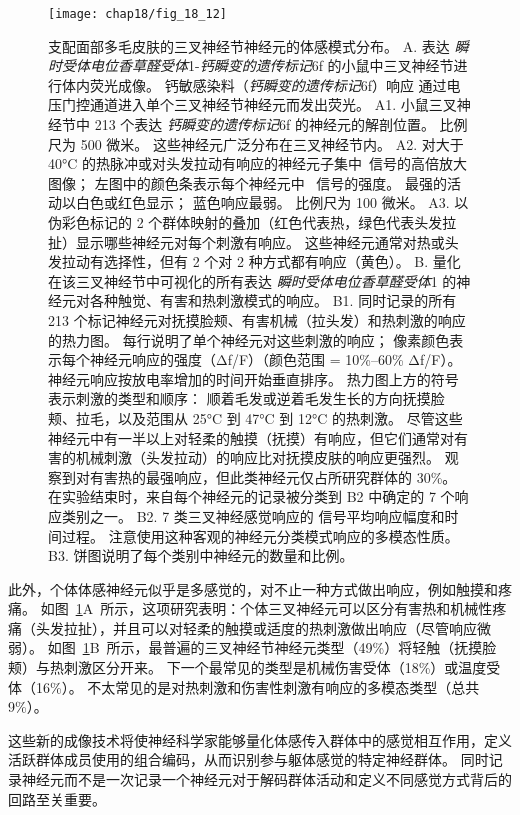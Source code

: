 \begin{figure}[htbp]
	\centering
	\texttt{[image: chap18/fig\_18\_12]}
	\caption{支配面部多毛皮肤的三叉神经节神经元的体感模式分布\cite{ghitani2017specialized}。
		A. 表达 \textit{瞬时受体电位香草醛受体}1-\textit{钙瞬变的遗传标记}6f 的小鼠中三叉神经节进行体内荧光成像。
		钙敏感染料（\textit{钙瞬变的遗传标记}6f）响应  通过电压门控通道进入单个三叉神经节神经元而发出荧光。
		A1. 小鼠三叉神经节中 213 个表达 \textit{钙瞬变的遗传标记}6f 的神经元的解剖位置。
		比例尺为 500 微米。
		这些神经元广泛分布在三叉神经节内。 
		A2. 对大于 40°C 的热脉冲或对头发拉动有响应的神经元子集中~信号的高倍放大图像；
		左图中的颜色条表示每个神经元中~ 信号的强度。
		最强的活动以白色或红色显示；
		蓝色响应最弱。
		比例尺为 100 微米。
		A3. 以伪彩色标记的 2 个群体映射的叠加（红色代表热，绿色代表头发拉扯）显示哪些神经元对每个刺激有响应。
		这些神经元通常对热或头发拉动有选择性，但有 2 个对 2 种方式都有响应（黄色）。
		B. 量化在该三叉神经节中可视化的所有表达 \textit{瞬时受体电位香草醛受体}1 的神经元对各种触觉、有害和热刺激模式的响应。
		B1. 同时记录的所有 213 个标记神经元对抚摸脸颊、有害机械（拉头发）和热刺激的响应的热力图。
		每行说明了单个神经元对这些刺激的响应；
		像素颜色表示每个神经元响应的强度（Δf/F）（颜色范围 = 10\%–60\% Δf/F）。
		神经元响应按放电率增加的时间开始垂直排序。
		热力图上方的符号表示刺激的类型和顺序：
		顺着毛发或逆着毛发生长的方向抚摸脸颊、拉毛，以及范围从 25°C 到 47°C 到 12°C 的热刺激。
		尽管这些神经元中有一半以上对轻柔的触摸（抚摸）有响应，但它们通常对有害的机械刺激（头发拉动）的响应比对抚摸皮肤的响应更强烈。
		观察到对有害热的最强响应，但此类神经元仅占所研究群体的 30\%。
		在实验结束时，来自每个神经元的记录被分类到 B2 中确定的 7 个响应类别之一。
		B2. 7 类三叉神经感觉响应的  信号平均响应幅度和时间过程。
		注意使用这种客观的神经元分类模式响应的多模态性质。
		B3. 饼图说明了每个类别中神经元的数量和比例。}
	\label{fig:18_12}
\end{figure}


此外，个体体感神经元似乎是多感觉的，对不止一种方式做出响应，例如触摸和疼痛。
如图~\ref{fig:18_12}A~所示，这项研究表明：个体三叉神经元可以区分有害热和机械性疼痛（头发拉扯），并且可以对轻柔的触摸或适度的热刺激做出响应（尽管响应微弱）。
如图~\ref{fig:18_12}B~所示，最普遍的三叉神经节神经元类型（49\%）将轻触（抚摸脸颊）与热刺激区分开来。 
下一个最常见的类型是机械伤害受体（18\%）或温度受体（16\%）。
不太常见的是对热刺激和伤害性刺激有响应的多模态类型（总共 9\%）。


这些新的成像技术将使神经科学家能够量化体感传入群体中的感觉相互作用，定义活跃群体成员使用的组合编码，从而识别参与躯体感觉的特定神经群体。
同时记录神经元而不是一次记录一个神经元对于解码群体活动和定义不同感觉方式背后的回路至关重要。


